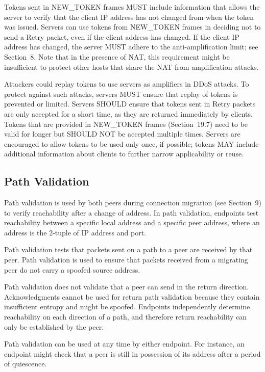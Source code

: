 \documentclass{article}
\begin{document}
Tokens sent in NEW\_TOKEN frames MUST include information that allows the server to verify that the client IP address has not changed from when the token was issued.  Servers can use tokens from NEW\_TOKEN frames in deciding not to send a Retry packet, even if the client address has changed.  If the client IP address has changed, the server MUST adhere to the anti-amplification limit; see Section~8. Note that in the presence of NAT, this requirement might be insufficient to protect other hosts that share the NAT from amplification attacks.

Attackers could replay tokens to use servers as amplifiers in DDoS attacks.  To protect against such attacks, servers MUST ensure that replay of tokens is prevented or limited.  Servers SHOULD ensure that tokens sent in Retry packets are only accepted for a short time, as they are returned immediately by clients.  Tokens that are provided in NEW\_TOKEN frames (Section~19.7) need to be valid for longer but SHOULD NOT be accepted multiple times.  Servers are encouraged to allow tokens to be used only once, if possible; tokens MAY include additional information about clients to further narrow applicability or reuse.

\subsection{Path Validation}

Path validation is used by both peers during connection migration (see Section~9) to verify reachability after a change of address.  In path validation, endpoints test reachability between a specific local address and a specific peer address, where an address is the 2-tuple of IP address and port.

Path validation tests that packets sent on a path to a peer are received by that peer.  Path validation is used to ensure that packets received from a migrating peer do not carry a spoofed source address.

Path validation does not validate that a peer can send in the return direction.  Acknowledgments cannot be used for return path validation because they contain insufficient entropy and might be spoofed. Endpoints independently determine reachability on each direction of a path, and therefore return reachability can only be established by the peer.

Path validation can be used at any time by either endpoint.  For instance, an endpoint might check that a peer is still in possession of its address after a period of quiescence.
\end{document}
